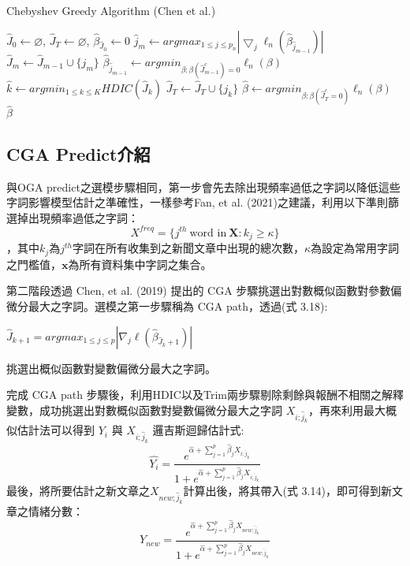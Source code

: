 \begin{algorithm}[h]
  \caption{Chebyshev Greedy Algorithm (Chen et al.)}
  \label{alg::conjugateGradient}
  \begin{algorithmic}[1]
  \State $\hat{J}_0 \leftarrow \varnothing $, $ \hat{J}_T \leftarrow \varnothing $, $ \hat{\beta}_{\hat{J}_0} \leftarrow 0 $
  \State $\hat{j}_m \leftarrow argmax_{1 \le j \le p_n}|\bigtriangledown_j\ell_n(\hat{\beta}_{\hat{j}_{m-1}})| $
  \State $ \hat{J}_m\leftarrow\hat{J}_{m-1}\cup\{j_m\} $
  \State $ \hat{\beta}_{\hat{j}_{m-1}} \leftarrow argmin_{\beta:\beta(\hat{J}^c_{m-1})=0}\ell_{n}(\beta) $
  \EndFor
  \State $\hat{k} \leftarrow argmin_{1 \leq k \leq K}HDIC(\hat{J}_k)$
  \State $\hat{J}_{T} \leftarrow \hat{J}_{T} \cup \{j_k\}$
  \EndIf
  \EndFor
  \State $\hat{\beta} \leftarrow argmin_{\beta:\beta(\hat{J}^c_{T} = 0)}\ell_{n}(\beta)$\\
  \Return $\hat{\beta}$
  \end{algorithmic}
\end{algorithm}

\subsection{CGA Predict介紹}
與OGA predict之選模步驟相同，第一步會先去除出現頻率過低之字詞以降低這些字詞影響模型估計之準確性，一樣參考Fan, et al. (2021)之建議，利用以下準則篩選掉出現頻率過低之字詞：
\begin{equation}
X^{freq}=\{j^{th}~\text{word in}~\bm{X}:k_j \geq \kappa \}
\end{equation}
，其中$k_{j}$為$j^{th}$字詞在所有收集到之新聞文章中出現的總次數，$\kappa$為設定為常用字詞之門檻值，$\bm{x}$為所有資料集中字詞之集合。

第二階段透過 Chen, et al. (2019) 提出的 CGA 步驟挑選出對數概似函數對參數偏微分最大之字詞。選模之第一步驟稱為 CGA path，透過(式 3.18):
\begin{center}
$\hat{J}_{k+1} = argmax_{1 \leq j \leq p}|\nabla_j \ell(\hat{\beta}_{\hat{J}_k+1})|$
\end{center}
挑選出概似函數對變數偏微分最大之字詞。

完成 CGA path 步驟後，利用HDIC以及Trim兩步驟剔除剩餘與報酬不相關之解釋變數，成功挑選出對數概似函數對變數偏微分最大之字詞 $X_{i;\hat{j}_k}$，再來利用最大概似估計法可以得到 $Y_i$ 與 $X_{i;\hat{j}_k}$ 邏吉斯迴歸估計式:
\begin{equation}
\hat{Y_i} = \displaystyle \frac{e^{\hat{\alpha}+\sum_{j=1}^{p}\hat{\beta}_jX_{i;\hat{j}_k}}}{1+e^{\hat{\alpha}+\sum_{j=1}^{p}\hat{\beta}_jX_{i;\hat{j}_k}}}
\end{equation}
最後，將所要估計之新文章之$X_{new;\hat{j}_k}$計算出後，將其帶入(式 3.14)，即可得到新文章之情緒分數：
\begin{equation}
Y_{new} = \displaystyle \frac{e^{\hat{\alpha}+\sum_{j=1}^{p}\hat{\beta}_jX_{new;\hat{j}_k}}}{1+e^{\hat{\alpha}+\sum_{j=1}^{p}\hat{\beta}_jX_{new;\hat{j}_k}}}
\end{equation}


